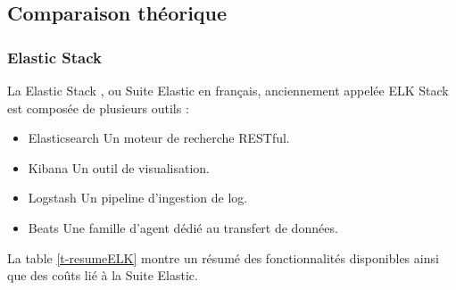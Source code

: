 \documentclass[paper=a4, fontsize=11pt]{scrartcl}
\begin{document}
\subsection{Comparaison théorique}
\subsubsection{Elastic Stack}
La \og Elastic Stack \fg, ou \og Suite Elastic \fg en français, anciennement appelée \og ELK Stack \fg est composée de plusieurs outils :
\begin{itemize}
    \item Elasticsearch \cite{noauthor_elasticsearch_nodate}
    \subitem Un moteur de recherche RESTful.
    \item Kibana \cite{noauthor_kibana_nodate}
    \subitem Un outil de visualisation.
    \item Logstash \cite{noauthor_logstash_nodate-1}
    \subitem Un pipeline d'ingestion de log.
    \item Beats \cite{noauthor_agents_nodate}
    \subitem Une famille d'agent dédié au transfert de données.
\end{itemize}

La table \ref{t-resumeELK} montre un résumé des fonctionnalités disponibles ainsi que des coûts lié à la Suite Elastic.
\end{document}
